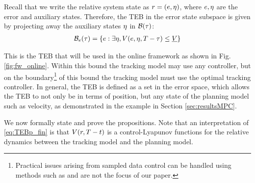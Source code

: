Recall that we write the relative system state as $r = (e, \eta)$, where $e,\eta$ are the error and auxiliary states.
Therefore, the TEB in the error state subspace is given by projecting away the auxiliary states $\eta$ in $\mathcal B(\tau)$:
  \begin{align} \label{eq:TEBp_fin}
  \TEB_\estate(\tau) = \{\estate: \exists \astate, \valfunc(\estate, \astate, \thor-\tau) \le \underline\valfunc\}
  \end{align}
  
This is the TEB that will be used in the online framework as shown in Fig. \ref{fig:fw_online}. 
Within this bound the tracking model may use any controller, but on the boundary\footnote{Practical issues arising from sampled data control can be handled using methods such as \cite{Mitchell2012, Mitchell13, Dabadie2014} and are not the focus of our paper.} of this bound the tracking model must use the optimal tracking controller.
In general, the TEB is defined as a set in the error space, which allows the TEB to not only be in terms of position, but any state of the planning model such as velocity, as demonstrated in the example in Section \ref{sec:resultsMPC}.

We now formally state and prove the propositions. 
Note that an interpretation of \eqref{eq:TEBp_fin} is that $V(r, T - t)$ is a control-Lyapunov functions for the relative dynamics between the tracking model and the planning model.

